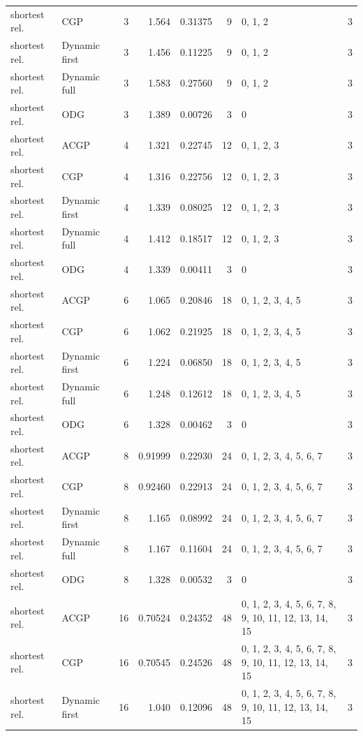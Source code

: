 \documentclass[10pt,a4paper]{article}
\begin{document}
\begin{longtable}{@{}p{23mm}p{29mm}rrrrp{36mm}r@{}}
shortest rel. & CGP & 3 & 1.564 & 0.31375 & 9 & 0, 1, 2 & 3 \\
shortest rel. & Dynamic first & 3 & 1.456 & 0.11225 & 9 & 0, 1, 2 & 3 \\
shortest rel. & Dynamic full & 3 & 1.583 & 0.27560 & 9 & 0, 1, 2 & 3 \\
shortest rel. & ODG & 3 & 1.389 & 0.00726 & 3 & 0 & 3 \\
shortest rel. & ACGP & 4 & 1.321 & 0.22745 & 12 & 0, 1, 2, 3 & 3 \\
shortest rel. & CGP & 4 & 1.316 & 0.22756 & 12 & 0, 1, 2, 3 & 3 \\
shortest rel. & Dynamic first & 4 & 1.339 & 0.08025 & 12 & 0, 1, 2, 3 & 3 \\
shortest rel. & Dynamic full & 4 & 1.412 & 0.18517 & 12 & 0, 1, 2, 3 & 3 \\
shortest rel. & ODG & 4 & 1.339 & 0.00411 & 3 & 0 & 3 \\
shortest rel. & ACGP & 6 & 1.065 & 0.20846 & 18 & 0, 1, 2, 3, 4, 5 & 3 \\
shortest rel. & CGP & 6 & 1.062 & 0.21925 & 18 & 0, 1, 2, 3, 4, 5 & 3 \\
shortest rel. & Dynamic first & 6 & 1.224 & 0.06850 & 18 & 0, 1, 2, 3, 4, 5 & 3 \\
shortest rel. & Dynamic full & 6 & 1.248 & 0.12612 & 18 & 0, 1, 2, 3, 4, 5 & 3 \\
shortest rel. & ODG & 6 & 1.328 & 0.00462 & 3 & 0 & 3 \\
shortest rel. & ACGP & 8 & 0.91999 & 0.22930 & 24 & 0, 1, 2, 3, 4, 5, 6, 7 & 3 \\
shortest rel. & CGP & 8 & 0.92460 & 0.22913 & 24 & 0, 1, 2, 3, 4, 5, 6, 7 & 3 \\
shortest rel. & Dynamic first & 8 & 1.165 & 0.08992 & 24 & 0, 1, 2, 3, 4, 5, 6, 7 & 3 \\
shortest rel. & Dynamic full & 8 & 1.167 & 0.11604 & 24 & 0, 1, 2, 3, 4, 5, 6, 7 & 3 \\
shortest rel. & ODG & 8 & 1.328 & 0.00532 & 3 & 0 & 3 \\
shortest rel. & ACGP & 16 & 0.70524 & 0.24352 & 48 & 0, 1, 2, 3, 4, 5, 6, 7, 8, 9, 10, 11, 12, 13, 14, 15 & 3 \\
shortest rel. & CGP & 16 & 0.70545 & 0.24526 & 48 & 0, 1, 2, 3, 4, 5, 6, 7, 8, 9, 10, 11, 12, 13, 14, 15 & 3 \\
shortest rel. & Dynamic first & 16 & 1.040 & 0.12096 & 48 & 0, 1, 2, 3, 4, 5, 6, 7, 8, 9, 10, 11, 12, 13, 14, 15 & 3 \\

\end{longtable}
\end{document}
